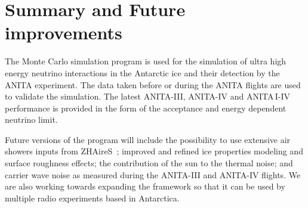 





\section{Summary and Future improvements}
\label{sec:future}
The \icemc Monte Carlo simulation program is used for the
simulation of ultra high energy neutrino interactions in the Antarctic
ice and their detection by the ANITA experiment.
The data taken before or during the ANITA flights are used to validate the
simulation.
The latest ANITA-III, ANITA-IV and ANITA\,I-IV performance is provided in the form of the
acceptance and energy dependent neutrino limit.
 
Future versions of the program will include the possibility to use extensive air showers inputs from ZHAireS~\cite{alvarez2012monte}; improved and refined ice properties modeling and surface roughness effects; the contribution of the sun to the thermal noise; and carrier wave noise as measured during the ANITA-III and ANITA-IV flights.
We are also working towards expanding the framework so that it can be used by multiple radio experiments based in Antarctica.
